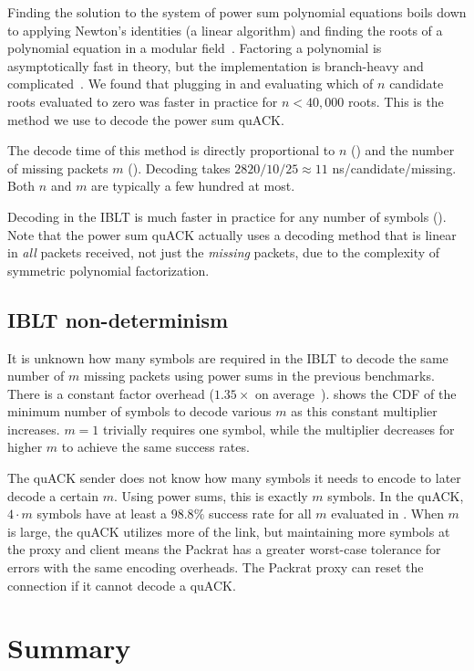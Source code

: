 Finding the solution to the system of power sum polynomial equations boils down
to applying Newton's identities (a linear algorithm) and finding the roots of a
polynomial equation
in a modular field~\cite{eppstein2011straggler}.
Factoring a polynomial is asymptotically fast in theory, but the implementation
is branch-heavy and complicated~\cite{batut2000user}.
We found that plugging in and evaluating which of $n$ candidate roots
evaluated to zero was faster in practice for $n < 40,000$ roots.
This is the method we use to decode the power sum quACK.

The decode time of this method is directly proportional to $n$ ()
and the number of missing packets $m$ ().
Decoding takes $2820/10/25 \approx 11$ ns/candidate/missing.
Both $n$ and $m$ are typically a few hundred at most.

Decoding in the IBLT is much faster in practice for any number of symbols
(). Note that the power sum quACK actually uses a decoding
method that is linear in \textit{all} packets received, not just the \textit
{missing} packets, due to the complexity of symmetric polynomial
factorization.

\subsection{IBLT non-determinism}
\label{sec:quack:microbenchmarks:non-determinism}




It is unknown how many symbols are required in the IBLT to decode the same
number of $m$ missing packets using power sums in the previous benchmarks.
There is a constant factor overhead ($1.35\times$ on average~\cite
{yang2024practical}).
 shows the CDF of the minimum number of symbols to decode
various $m$ as this constant multiplier increases. $m=1$ trivially requires
one symbol, while the multiplier decreases for higher $m$ to achieve the same
success rates.

The quACK sender does not know how many symbols it needs to encode to later
decode a certain $m$. Using power sums, this is exactly $m$ symbols. In
the quACK, $4 \cdot m$ symbols have at least a $\!98.8\%$ success rate for
all $m$ evaluated in . When $m$ is large, the quACK utilizes more
of the link, but maintaining more symbols at the proxy and client means
the Packrat has a greater worst-case tolerance for errors with the same encoding
overheads. The Packrat proxy can reset the connection if it cannot decode a quACK.

\section{Summary}
\label{sec:quack:summary}
